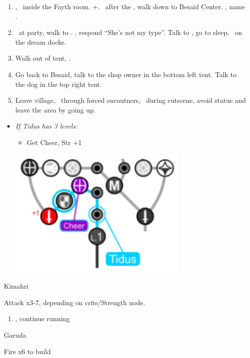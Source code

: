 \begin{enumerate}[resume]
  \item \cs[1:00], \sd\ inside the Fayth room. \fmv+\cs[1:00]. \sd\ after the \fmv, walk down to Besaid Center. \cs[1:40], name \valefor.
  \item \sd\ at party, walk to \yuna. \sd, respond ``She's not my type''. Talk to \wakka, go to sleep, \sd\ on the dream docks.
  \item Walk out of tent, \sd.
  \item Go back to Besaid, talk to the shop owner in the bottom left tent. Talk to the dog in the top right tent.
  \item Leave village, \sd\ through forced encoutners, \sd\ during cutscene, avoid statue and leave the area by going up.
\end{enumerate}
\begin{spheregrid}
  \begin{itemize}
    \item \textit{If Tidus has 3 levels:}
          \begin{itemize}
            \item Get Cheer, Str +1
          \end{itemize}
          \includegraphics{graphics/tiduscheer}
  \end{itemize}
\end{spheregrid}
\begin{battle}[750]{Kimahri}
  \begin{itemize}
    \tidusf Attack x3-7, depending on crits/Strength node.
  \end{itemize}
\end{battle}
\begin{enumerate}[resume]
  \item \sd, continue running
\end{enumerate}
\begin{battle}{Garuda}
  \begin{itemize}
    \summon{\valefor}
    \valeforf Fire x6 to build \od
  \end{itemize}
\end{battle}

